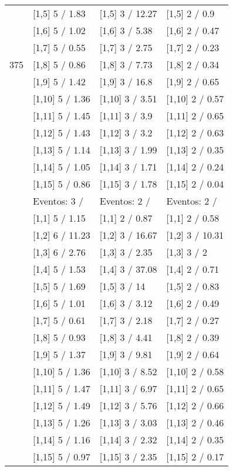 \begin{table}
\begin{tabular}[t]{llll}
 & {}[1,5] 5  / 1.83 & {}[1,5] 3  / 12.27 & {}[1,5] 2  / 0.9\\
 & {}[1,6] 5  / 1.02 & {}[1,6] 3  / 5.38 & {}[1,6] 2  / 0.47\\
 & {}[1,7] 5  / 0.55 & {}[1,7] 3  / 2.75 & {}[1,7] 2  / 0.23\\
375 & {}[1,8] 5  / 0.86 & {}[1,8] 3  / 7.73 & {}[1,8] 2  / 0.34\\
\addlinespace
 & {}[1,9] 5  / 1.42 & {}[1,9] 3  / 16.8 & {}[1,9] 2  / 0.65\\
 & {}[1,10] 5  / 1.36 & {}[1,10] 3  / 3.51 & {}[1,10] 2  / 0.57\\
 & {}[1,11] 5  / 1.45 & {}[1,11] 3  / 3.9 & {}[1,11] 2  / 0.65\\
 & {}[1,12] 5  / 1.43 & {}[1,12] 3  / 3.2 & {}[1,12] 2  / 0.63\\
 & {}[1,13] 5  / 1.14 & {}[1,13] 3  / 1.99 & {}[1,13] 2  / 0.35\\
\addlinespace
 & {}[1,14] 5  / 1.05 & {}[1,14] 3  / 1.71 & {}[1,14] 2  / 0.24\\
 & {}[1,15] 5  / 0.86 & {}[1,15] 3  / 1.78 & {}[1,15] 2  / 0.04\\
 & Eventos:  3 / & Eventos:  2 / & Eventos:  2 /\\
 & {}[1,1] 5  / 1.15 & {}[1,1] 2  / 0.87 & {}[1,1] 2  / 0.58\\
 & {}[1,2] 6  / 11.23 & {}[1,2] 3  / 16.67 & {}[1,2] 3  / 10.31\\
\addlinespace
 & {}[1,3] 6  / 2.76 & {}[1,3] 3  / 2.35 & {}[1,3] 3  / 2\\
 & {}[1,4] 5  / 1.53 & {}[1,4] 3  / 37.08 & {}[1,4] 2  / 0.71\\
 & {}[1,5] 5  / 1.69 & {}[1,5] 3  / 14 & {}[1,5] 2  / 0.83\\
 & {}[1,6] 5  / 1.01 & {}[1,6] 3  / 3.12 & {}[1,6] 2  / 0.49\\
 & {}[1,7] 5  / 0.61 & {}[1,7] 3  / 2.18 & {}[1,7] 2  / 0.27\\
\addlinespace
500 & {}[1,8] 5  / 0.93 & {}[1,8] 3  / 4.41 & {}[1,8] 2  / 0.39\\
 & {}[1,9] 5  / 1.37 & {}[1,9] 3  / 9.81 & {}[1,9] 2  / 0.64\\
 & {}[1,10] 5  / 1.36 & {}[1,10] 3  / 8.52 & {}[1,10] 2  / 0.58\\
 & {}[1,11] 5  / 1.47 & {}[1,11] 3  / 6.97 & {}[1,11] 2  / 0.65\\
 & {}[1,12] 5  / 1.49 & {}[1,12] 3  / 5.76 & {}[1,12] 2  / 0.66\\
\addlinespace
 & {}[1,13] 5  / 1.26 & {}[1,13] 3  / 3.03 & {}[1,13] 2  / 0.46\\
 & {}[1,14] 5  / 1.16 & {}[1,14] 3  / 2.32 & {}[1,14] 2  / 0.35\\
 & {}[1,15] 5  / 0.97 & {}[1,15] 3  / 2.35 & {}[1,15] 2  / 0.17\\
\bottomrule
\end{tabular}
\end{table}
